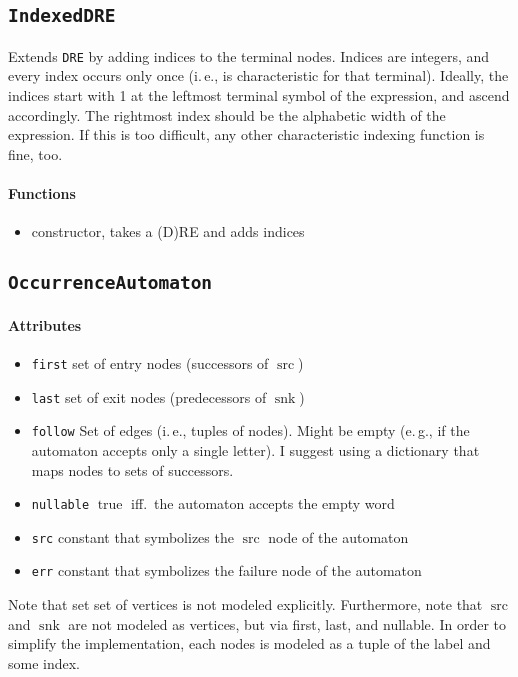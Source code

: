 \documentclass[a4paper,11pt, svgnames,titlepage]{article}
\DeclareMathOperator{\src}{src}
\DeclareMathOperator{\snk}{snk}
\newcommand{\true}{\ensuremath{\operatorname{true}}\xspace}
\begin{document}
\subsection{\texttt{IndexedDRE}}\label{sec:des:idre}
Extends \texttt{DRE} by adding indices to the terminal nodes. Indices are integers, and every index occurs only once (i.\,e., is characteristic for that terminal). Ideally, the indices start with 1 at the leftmost terminal symbol of the expression, and ascend accordingly. The rightmost index should be the alphabetic width of the expression. If this is too difficult, any other characteristic indexing function is fine, too.
\paragraph{Functions}
\begin{itemize}
	\item constructor, takes a (D)RE and adds indices
\end{itemize}

\subsection{\texttt{OccurrenceAutomaton}}\label{sec:des:oa}
\paragraph{Attributes}
\begin{itemize}
	\item\texttt{first} set of entry nodes (successors of $\src$)
	\item\texttt{last} set of exit nodes (predecessors of $\snk$)
	\item\texttt{follow} Set of edges (i.\,e., tuples of nodes). Might be empty (e.\,g., if the automaton accepts only a single letter). I suggest using a dictionary that maps nodes to sets of successors. 
	\item\texttt{nullable} \true iff.\ the automaton accepts the empty word
	\item\texttt{src} constant that symbolizes the $\src$ node of the automaton
	\item\texttt{err} constant that symbolizes the failure node of the automaton	
\end{itemize}
Note that set set of vertices is not modeled explicitly. Furthermore, note that $\src$ and $\snk$ are not modeled as vertices, but via first, last, and nullable. In order to simplify the implementation, each nodes is modeled as a tuple of the label and some index.
\end{document}
